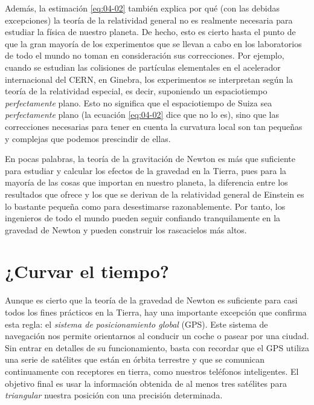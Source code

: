 Además, la estimación \eqref{eq:04-02} también explica por qué (con las debidas
excepciones) la teoría de la relatividad general no es realmente necesaria para
estudiar la física de nuestro planeta. De hecho, esto es cierto hasta el punto de
que la gran mayoría de los experimentos que se llevan a cabo en los laboratorios
de todo el mundo no toman en consideración sus correcciones. Por ejemplo, cuando
se estudian las colisiones de partículas elementales en el acelerador internacional
del CERN, en Ginebra, los experimentos se interpretan según la teoría de
la relatividad especial, es decir, suponiendo un
espaciotiempo \emph{perfectamente} plano. Esto no significa que el espaciotiempo de
Suiza sea \emph{perfectamente} plano (la ecuación \eqref{eq:04-02} dice que no lo
es), sino que las correcciones necesarias para tener en cuenta la curvatura local
son tan pequeñas y complejas que podemos prescindir de ellas.

En pocas palabras, la teoría de la gravitación de Newton es más que suficiente
para estudiar y calcular los efectos de la gravedad en la Tierra, pues para la
mayoría de las cosas que importan en nuestro planeta, la diferencia entre los
resultados que ofrece y los que se derivan de la relatividad general de Einstein
es lo bastante pequeña como para desestimarse razonablemente. Por tanto, los
ingenieros de todo el mundo pueden seguir confiando tranquilamente en la gravedad
de Newton y pueden construir los rascacielos más altos.

\section{¿Curvar el tiempo?}\label{sec:04-time}

Aunque es cierto que la teoría de la gravedad de Newton es suficiente para casi
todos los fines prácticos en la Tierra, hay una importante excepción que confirma
esta regla: el \emph{sistema de posicionamiento global}
(GPS). Este sistema de navegación
nos permite orientarnos al conducir un coche o pasear por una ciudad. Sin entrar en
detalles de su funcionamiento, basta con recordar que el GPS utiliza una serie de
satélites que están en órbita terrestre y que se comunican continuamente con
receptores en tierra, como nuestros teléfonos inteligentes. El objetivo final es
usar la información obtenida de al menos tres satélites para \emph{triangular}
nuestra posición con una precisión determinada.

